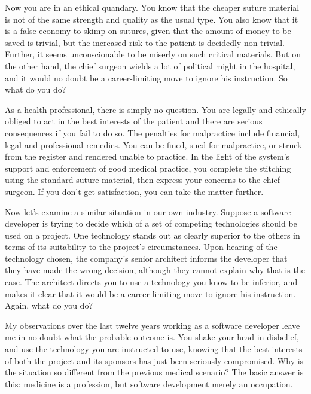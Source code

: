 \documentclass{article}
\begin{document}
Now you are in an ethical quandary. You know that the cheaper suture
material is not of the same strength and quality as the usual type. You
also know that it is a false economy to skimp on sutures, given that the
amount of money to be saved is trivial, but the increased risk to the
patient is decidedly non-trivial. Further, it seems unconscionable to be
miserly on such critical materials. But on the other hand, the chief
surgeon wields a lot of political might in the hospital, and it would no
doubt be a career-limiting move to ignore his instruction. So what do
you do?

As a health professional, there is simply no question. You are legally
and ethically obliged to act in the best interests of the patient and
there are serious consequences if you fail to do so. The penalties for
malpractice include financial, legal and professional remedies. You can
be fined, sued for malpractice, or struck from the register and rendered
unable to practice. In the light of the system's support and enforcement
of good medical practice, you complete the stitching using the standard
suture material, then express your concerns to the chief surgeon. If you
don't get satisfaction, you can take the matter further.

Now let's examine a similar situation in our own industry. Suppose a
software developer is trying to decide which of a set of competing
technologies should be used on a project. One technology stands out as
clearly superior to the others in terms of its suitability to the
project's circumstances. Upon hearing of the technology chosen, the
company's senior architect informs the developer that they have made the
wrong decision, although they cannot explain why that is the case. The
architect directs you to use a technology you know to be inferior, and
makes it clear that it would be a career-limiting move to ignore his
instruction. Again, what do you do?

My observations over the last twelve years working as a software
developer leave me in no doubt what the probable outcome is. You shake
your head in disbelief, and use the technology you are instructed to
use, knowing that the best interests of both the project and its
sponsors has just been seriously compromised. Why is the situation so
different from the previous medical scenario? The basic answer is this:
medicine is a profession, but software development merely an occupation.
\end{document}
